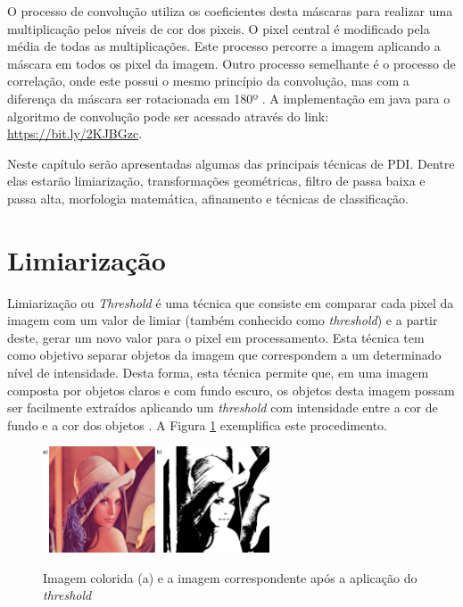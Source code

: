 \documentclass[
	12pt,				%
	oneside,			%
	a4paper,			%
	english,			%
	french,				%
	spanish,			%
	brazil,				%
	]{abntex2}
\begin{document}
O processo de convolução utiliza os coeficientes desta máscaras para realizar uma multiplicação pelos níveis de cor dos pixeis. O pixel central é modificado pela média de todas as multiplicações. Este processo percorre a imagem aplicando a máscara em todos os pixel da imagem. Outro processo semelhante é o processo de correlação, onde este possui o mesmo princípio da convolução, mas com a diferença da máscara ser rotacionada em 180º \cite{gonzalesWoods:2008}. A implementação em java para o algoritmo de convolução pode ser acessado através do link: \url{https://bit.ly/2KJBGzc}.

Neste capítulo serão apresentadas algumas das principais técnicas de PDI. Dentre elas estarão limiarização, transformações geométricas, filtro de passa baixa e passa alta, morfologia matemática, afinamento e técnicas de classificação.
\section{Limiarização}
\label{sec:limiarizacao}

Limiarização ou \textit{Threshold} é uma técnica que consiste em comparar cada pixel da imagem com um valor de limiar (também conhecido como \textit{threshold}) e a partir deste, gerar um novo valor para o pixel em processamento. Esta técnica tem como objetivo separar objetos da imagem que correspondem a um determinado nível de intensidade. Desta forma, esta técnica permite que, em uma imagem composta por objetos claros e com fundo escuro, os objetos desta imagem possam ser facilmente extraídos aplicando um \textit{threshold} com intensidade entre a cor de fundo e a cor dos objetos \cite{gonzalesWoods:2008}. A Figura \ref{fig:limiarizacaofig} exemplifica este procedimento.

\begin{figure}[ht]
\centering

\caption{Imagem colorida (a) e a imagem correspondente após a aplicação do \textit{threshold}}
\includegraphics[width=0.6\textwidth]{imagens/limiarizacao.png}
\sourceAuthor
\label{fig:limiarizacaofig}
\end{figure}
\end{document}

